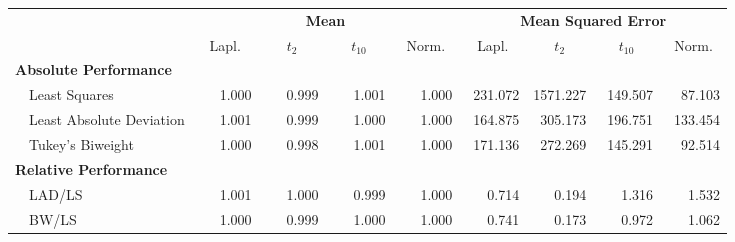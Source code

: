 %
\begin{center}
\begin{tabular}{|l||c|c|c|c||c|c|c|c|} \hline
\multicolumn{1}{|l||}{\bf }&\multicolumn{4}{c||}{\bf Mean}&\multicolumn{4}{c|}{\bf Mean Squared Error}\\ \cline{2-9}
\multicolumn{1}{|l||}{}&\multicolumn{1}{c|}{Lapl.}&\multicolumn{1}{c|}{$t_2$}&\multicolumn{1}{c|}{$t_{10}$}&\multicolumn{1}{c||}{Norm.}&\multicolumn{1}{c|}{Lapl.}&\multicolumn{1}{c|}{$t_2$}&\multicolumn{1}{c|}{$t_{10}$}&\multicolumn{1}{c|}{Norm.}\\ \hline
{\bf Absolute Performance}&&&&&&&&\\
~~Least Squares&~~~1.000&~~~0.999&~~~1.001&~~~1.000&~231.072&1571.227&~149.507&~~87.103\\ 
~~Least Absolute Deviation&~~~1.001&~~~0.999&~~~1.000&~~~1.000&~164.875&~305.173&~196.751&~133.454\\ 
~~Tukey's Biweight&~~~1.000&~~~0.998&~~~1.001&~~~1.000&~171.136&~272.269&~145.291&~~92.514\\ \hline
{\bf Relative Performance}&&&&&&&&\\
~~LAD/LS&~~~1.001&~~~1.000&~~~0.999&~~~1.000&~~~0.714&~~~0.194&~~~1.316&~~~1.532\\ 
~~BW/LS&~~~1.000&~~~0.999&~~~1.000&~~~1.000&~~~0.741&~~~0.173&~~~0.972&~~~1.062\\ 
\hline
\end{tabular}
\end{center}
